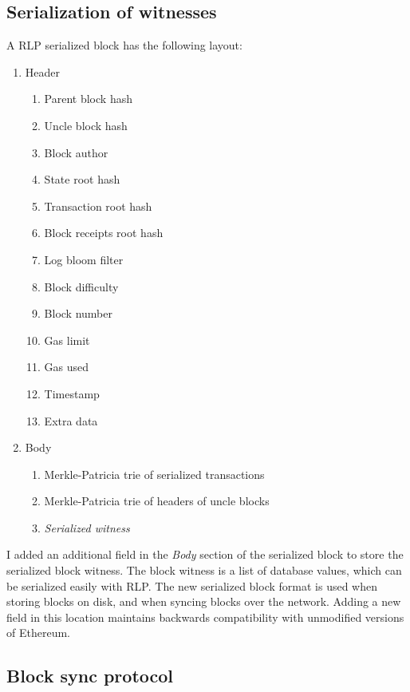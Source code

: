 \documentclass[12pt]{article}
\newcounter{protocol}
\begin{document}
\subsection{Serialization of witnesses}
A RLP serialized block has the following layout:
\begin{enumerate}
  \item Header
  \begin{enumerate}
    \item Parent block hash
    \item Uncle block hash
    \item Block author
    \item State root hash
    \item Transaction root hash
    \item Block receipts root hash
    \item Log bloom filter
    \item Block difficulty
    \item Block number
    \item Gas limit
    \item Gas used
    \item Timestamp
    \item Extra data
  \end{enumerate}
  \item Body
  \begin{enumerate}
    \item Merkle-Patricia trie of serialized transactions
    \item Merkle-Patricia trie of headers of uncle blocks
    \item \emph{Serialized witness}
  \end{enumerate}
\end{enumerate}

I added an additional field in the \emph{Body} section of the serialized block to store the serialized block witness. The block witness is a list of database values, which can be serialized easily with RLP. The new serialized block format is used when storing blocks on disk, and when syncing blocks over the network. Adding a new field in this location maintains backwards compatibility with unmodified versions of Ethereum.

\subsection{Block sync protocol}
\end{document}
